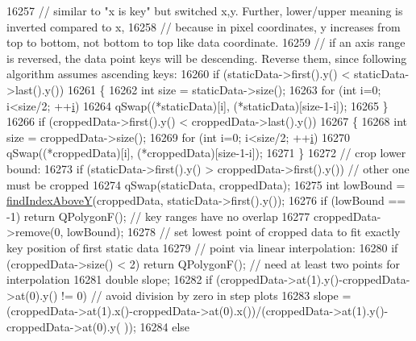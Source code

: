 \begin{DoxyCode}
16257     \textcolor{comment}{// similar to "x is key" but switched x,y. Further, lower/upper meaning is inverted compared to x,}
16258     \textcolor{comment}{// because in pixel coordinates, y increases from top to bottom, not bottom to top like data
       coordinate.}
16259     \textcolor{comment}{// if an axis range is reversed, the data point keys will be descending. Reverse them, since following
       algorithm assumes ascending keys:}
16260     \textcolor{keywordflow}{if} (staticData->first().y() < staticData->last().y())
16261     \{
16262       \textcolor{keywordtype}{int} size = staticData->size();
16263       \textcolor{keywordflow}{for} (\textcolor{keywordtype}{int} i=0; i<size/2; ++\hyperlink{_comparision_pictures_2_createtest_image_8m_a6f6ccfcf58b31cb6412107d9d5281426}{i})
16264         qSwap((*staticData)[i], (*staticData)[size-1-i]);
16265     \}
16266     \textcolor{keywordflow}{if} (croppedData->first().y() < croppedData->last().y())
16267     \{
16268       \textcolor{keywordtype}{int} size = croppedData->size();
16269       \textcolor{keywordflow}{for} (\textcolor{keywordtype}{int} i=0; i<size/2; ++\hyperlink{_comparision_pictures_2_createtest_image_8m_a6f6ccfcf58b31cb6412107d9d5281426}{i})
16270         qSwap((*croppedData)[i], (*croppedData)[size-1-i]);
16271     \}
16272     \textcolor{comment}{// crop lower bound:}
16273     \textcolor{keywordflow}{if} (staticData->first().y() > croppedData->first().y()) \textcolor{comment}{// other one must be cropped}
16274       qSwap(staticData, croppedData);
16275     \textcolor{keywordtype}{int} lowBound = \hyperlink{class_q_c_p_graph_adf50243f1df203883a2187089734bfcb}{findIndexAboveY}(croppedData, staticData->first().y());
16276     \textcolor{keywordflow}{if} (lowBound == -1) \textcolor{keywordflow}{return} QPolygonF(); \textcolor{comment}{// key ranges have no overlap}
16277     croppedData->remove(0, lowBound);
16278     \textcolor{comment}{// set lowest point of cropped data to fit exactly key position of first static data}
16279     \textcolor{comment}{// point via linear interpolation:}
16280     \textcolor{keywordflow}{if} (croppedData->size() < 2) \textcolor{keywordflow}{return} QPolygonF(); \textcolor{comment}{// need at least two points for interpolation}
16281     \textcolor{keywordtype}{double} slope;
16282     \textcolor{keywordflow}{if} (croppedData->at(1).y()-croppedData->at(0).y() != 0) \textcolor{comment}{// avoid division by zero in step plots}
16283       slope = (croppedData->at(1).x()-croppedData->at(0).x())/(croppedData->at(1).y()-croppedData->at(0).y(
      ));
16284     \textcolor{keywordflow}{else}

\end{DoxyCode}
